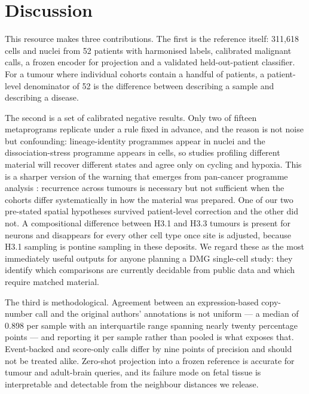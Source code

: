 \documentclass[12pt,a4paper]{article}
\begin{document}


\section{Discussion}

This resource makes three contributions. The first is the reference itself: 311,618 cells and nuclei from 52 patients
with harmonised labels, calibrated malignant calls, a frozen encoder for projection and a validated held-out-patient
classifier. For a tumour where individual cohorts contain a handful of patients, a patient-level denominator of 52 is
the difference between describing a sample and describing a disease.

The second is a set of calibrated negative results. Only two of fifteen metaprograms replicate under a rule fixed in
advance, and the reason is not noise but confounding: lineage-identity programmes appear in nuclei and the
dissociation-stress programme appears in cells, so studies profiling different material will recover different states
and agree only on cycling and hypoxia. This is a sharper version of the warning that emerges from pan-cancer programme
analysis \citep{gavish2023hallmarks}: recurrence across tumours is necessary but not sufficient when the cohorts differ
systematically in how the material was prepared. One of our two pre-stated spatial hypotheses survived patient-level
correction and the other did not. A compositional difference between H3.1 and H3.3 tumours is present for neurons and
disappears for every other cell type once site is adjusted, because H3.1 sampling is pontine sampling in these
deposits. We regard these as the most immediately useful outputs for anyone planning a DMG single-cell study: they
identify which comparisons are currently decidable from public data and which require matched material.

The third is methodological. Agreement between an expression-based copy-number call and the original authors'
annotations is not uniform --- a median of 0.898 per sample with an interquartile range spanning nearly twenty
percentage points --- and reporting it per sample rather than pooled is what exposes that. Event-backed and score-only
calls differ by nine points of precision and should not be treated alike. Zero-shot projection into a frozen reference
is accurate for tumour and adult-brain queries, and its failure mode on fetal tissue is interpretable and detectable
from the neighbour distances we release.
\end{document}
